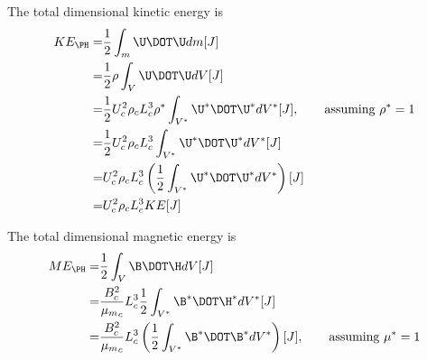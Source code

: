\documentclass[11pt]{article}
\begin{document}
\doublespacing
\MOONSTITLE
\maketitle

The total dimensional kinetic energy is
\begin{equation}\begin{aligned}
KE_{\PH} =& \frac{1}{2} \int_m \U \DOT \U dm [J] \\
         =& \frac{1}{2} \rho \int_V \U \DOT \U dV [J] \\
         =& \frac{1}{2} U_c^2 \rho_c L_c^3 \rho^* \int_{V^*} \U^* \DOT \U^* dV^* [J], \qquad \text{assuming $\rho^*=1$} \\
         =& \frac{1}{2} U_c^2 \rho_c L_c^3        \int_{V^*} \U^* \DOT \U^* dV^* [J] \\
         =& U_c^2 \rho_c L_c^3 \left( \frac{1}{2} \int_{V^*} \U^* \DOT \U^* dV^* \right) [J] \\
         =& U_c^2 \rho_c L_c^3 KE [J] \\
\end{aligned}\end{equation}

The total dimensional magnetic energy is
\begin{equation}\begin{aligned}
ME_{\PH} =& \frac{1}{2} \int_V \B \DOT \H dV [J] \\
         =& \frac{B_c^2}{{\mu_m}_c} L_c^3 \frac{1}{2} \int_{V^*} \B^* \DOT \H^* dV^* [J] \\
         =& \frac{B_c^2}{{\mu_m}_c} L_c^3 \left( \frac{1}{2} \int_{V^*} \B^* \DOT \B^* dV^* \right) [J], \qquad \text{assuming $\mu^*=1$} \\
\end{aligned}\end{equation}
\end{document}
